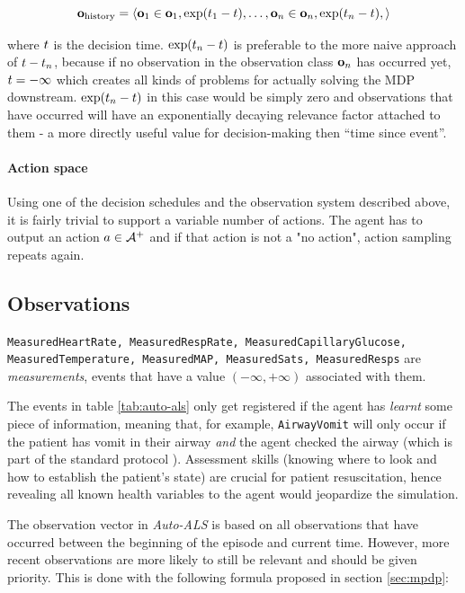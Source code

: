 \begin{equation} 
  \mathbf{o}_\text{history} = \langle \mathbf{o}_1 \in \mathbf{o}_1, \exp(t_1-t), \dots, \mathbf{o}_n \in \mathbf{o}_n, \exp(t_n-t), \rangle
\end{equation}

where $t$ is the decision time. 
$\exp(t_n-t)$ is preferable to the more naive approach of $t-t_n$, because if no observation in the observation class $\mathbf{o}_n$ has occurred yet, $t=-\infty$ which creates all kinds of problems for actually solving the MDP downstream. 
$\exp(t_n-t)$ in this case would be simply zero and observations that have occurred will have an exponentially decaying relevance factor attached to them - a more directly useful value for decision-making then ``time since event''.

\paragraph{Action space}

Using one of the decision schedules and the observation system described above, it is fairly trivial to support a variable number of actions. 
The agent has to output an action $a \in \mathcal{A}^{+}$ and if that action is not a "no action", action sampling repeats again.

\newpage
\subsection{Observations}
\label{sec:auto-als-obs}

\texttt{MeasuredHeartRate, MeasuredRespRate, MeasuredCapillaryGlucose, MeasuredTemperature, MeasuredMAP, MeasuredSats, MeasuredResps} are \emph{measurements}, events that have a value $(-\infty, +\infty)$ associated with them.

The events in table \ref{tab:auto-als} only get registered if the agent has \emph{learnt} some piece of information, meaning that, for example, \verb|AirwayVomit| will only occur if the patient has vomit in their airway \emph{and} the agent checked the airway (which is part of the standard protocol \cite{thimInitialAssessmentTreatment2012}).
Assessment skills (knowing where to look and how to establish the patient's state) are crucial for patient resuscitation, hence revealing all known health variables to the agent would jeopardize the simulation.

The observation vector in \emph{Auto-ALS} is based on all observations that have occurred between the beginning of the episode and current time.
However, more recent observations are more likely to still be relevant and should be given priority.
This is done with the following formula proposed in section \ref{sec:mpdp}:

